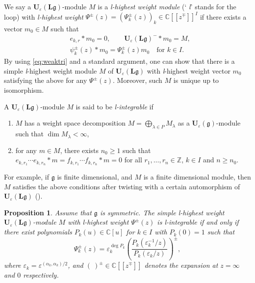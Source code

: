 \documentclass[12pt]{amsart}
\def\Bbb{\mathbb}
\renewcommand{\labelenumi}{(\theenumi)}%
\newenvironment{aenume}{%
  \begin{enumerate}%
  \renewcommand{\theenumi}{\alph{enumi}}%
  \renewcommand{\labelenumi}{(\theenumi)}%
  }{\end{enumerate}}
\newtheorem{Proposition}[equation]{Proposition}
\theoremstyle{definition}
\theoremstyle{remark}
\numberwithin{equation}{subsection}
\newcommand{\C}{{\Bbb C}}
\newcommand{\Z}{{\Bbb Z}}
\newcommand{\Ue}{{\mathbf U}_{\varepsilon}(\mathfrak g)}
\newcommand{\Ule}{{\mathbf U}_{\varepsilon}({\mathbf L}\mathfrak g)}
\begin{document}
We say a $\Ule$-module $M$ is a {\it l-highest weight module\/} (`{\it
l\/}' stands for the loop) with {\it l-highest weight\/} 
$\Psi^\pm(z) = (\Psi^{\pm}_{k}(z))_k\in \C[[z^{\mp}]]^I$
if there exists a vector $m_0\in M$ such that
\begin{align}
  & e_{k,r}\ast m_0 = 0, \qquad \Ule^- \ast m_0 = M, \\
  & \psi^{\pm}_{k}(z)\ast m_0 = \Psi^{\pm}_{k}(z) m_0
    \quad\text{for $k\in I$}.
\end{align}
%
By using \eqref{eq:weaktri} and a standard argument, one can show that 
there is a simple {\it l\/}-highest weight module $M$ of $\Ule$ with
{\it l\/}-highest weight vector $m_0$ satisfying the above for any
$\Psi^{\pm}(z)$. Moreover, such $M$ is unique up to isomorphism.

A $\Ule$-module $M$ is said to be {\it l-integrable\/} if 
\begin{aenume}
\item $M$ has a weight space decomposition
$M = \bigoplus_{\lambda\in P} M_\lambda$ as a $\Ue$-module such that
$\dim M_\lambda < \infty$,
\item for any $m\in M$, there exists $n_0\ge 1$ such that
$e_{k,r_1}\cdots e_{k,r_n} \ast m = 
f_{k,r_1}\cdots f_{k,r_n} \ast m = 0$
for all $r_1,\dots,r_n\in\Z$, $k\in I$ and $n\ge n_0$.
\end{aenume}
For example, if $\mathfrak g$ is finite dimensional, and $M$ is a
finite dimensional module, then $M$ satisfies the above conditions
after twisting with a certain automorphism of $\Ule$
(\cite[12.2.3]{CP}).

\begin{Proposition}\label{prop:DrPol}
Assume that $\mathfrak g$ is symmetric.
%
The simple {\it l\/}-highest weight $\Ule$-module $M$ with 
{\it l\/}-highest weight $\Psi^{\pm}(z)$ is {\it l\/}-integrable if and
only if there exist polynomials $P_k(u)\in \C[u]$ for $k\in I$ with
$P_k(0) = 1$ such that
\begin{equation}
\label{eq:DrPol}
%
  \Psi^{\pm}_{k}(z) = \varepsilon_k^{\deg P_k}
  \left(\frac{P_k(\varepsilon_k^{-1}/z)}{P_k(\varepsilon_k/z)}\right)^{\pm},
%
\end{equation}
where $\varepsilon_k = \varepsilon^{(\alpha_k,\alpha_k)/2}$,
and
$\left(\ \right)^{\pm}
\in\C[[z^{\mp}]]$ denotes the expansion at $z = \infty$ and $0$
respectively.
\end{Proposition}
\end{document}
